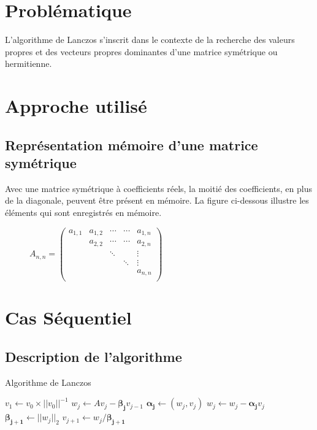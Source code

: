\documentclass[11pt,french]{article}
\begin{document}
	\section{Problématique}
	\par L'algorithme de Lanczos s'inscrit dans le contexte de la recherche des valeurs propres et des vecteurs propres dominantes d'une matrice symétrique ou hermitienne.
	\section{Approche utilisé}
	
	\subsection{Représentation mémoire d'une matrice symétrique}
	Avec une matrice symétrique à coefficients réels, la moitié des coefficients, en plus de la diagonale, peuvent être présent en mémoire. La figure ci-dessous illustre les éléments qui sont enregistrés en mémoire.
		\begin{figure}[h]
		\centering
		$A _{n, n}=
		\begin{pmatrix}
			a_{1,1} & a_{1,2}& \cdots & \cdots & a_{1,n} \\  
			   & a_{2,2} & \cdots & \cdots & a_{2,n} \\  
			   &   & \ddots &   & \vdots \\  
			   &   &   & \ddots & \vdots \\  
			   &   &   &   & a_{n,n}\\  
		\end{pmatrix}
		$
	\end{figure}
	 \newpage 
	\section{Cas Séquentiel}
	
	\subsection{Description de l'algorithme}
	\begin{algorithm}
		\caption{Algorithme de Lanczos}\label{alg:lanczos}
		\begin{algorithmic}[1]
			\State $v_1 \gets v_0 \times|| v_0||^{-1} $
				\State $w_j \gets Av_j - \boldsymbol{\beta_j }v_{j-1}$
				\State $\boldsymbol{\alpha_j} \gets (w_j,v_j)$
				\State $w_j \gets w_j - \boldsymbol{\alpha_j} v_j$
				\State $\boldsymbol{\beta_{j+1}} \gets || w_j||_2$
				\State $ v_{j+1} \gets w_j /\boldsymbol{\beta_{j+1}} $
			\EndFor
			\State \Return 
		\end{algorithmic}
	\end{algorithm}
	
\end{document}
